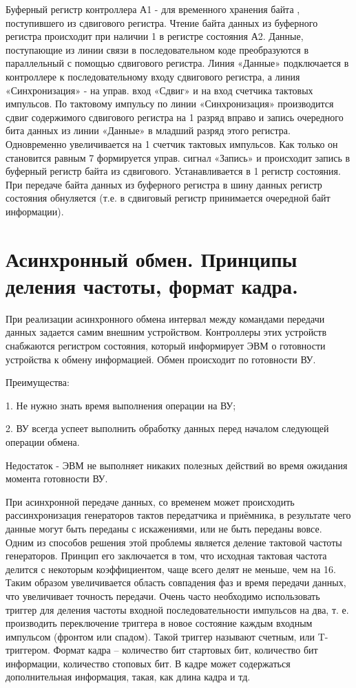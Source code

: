 \documentclass{article}
\begin{document}
Буферный регистр контроллера А1 - для временного хранения байта , поступившего из сдвигового регистра. Чтение байта данных из буферного регистра происходит при наличии 1 в регистре состояния А2.
Данные, поступающие из линии связи в последовательном коде преобразуются в параллельный с помощью сдвигового регистра. Линия «Данные» подключается в контроллере к последовательному входу сдвигового регистра, а линия «Синхронизация» - на управ. вход «Сдвиг» и на вход счетчика тактовых импульсов. По тактовому импульсу по линии «Синхронизация» производится сдвиг содержимого сдвигового регистра на 1 разряд вправо и запись очередного бита данных из линии «Данные» в младший разряд этого регистра. Одновременно увеличивается на 1 счетчик тактовых импульсов. Как только он становится равным 7 формируется управ. сигнал «Запись» и происходит запись в буферный регистр байта из сдвигового. Устанавливается в 1 регистр состояния.
При передаче байта данных из буферного регистра в шину данных регистр состояния обнуляется (т.е. в сдвиговый регистр принимается очередной байт информации).

\section{Асинхронный обмен. Принципы деления частоты, формат кадра.}

При реализации асинхронного обмена интервал между командами передачи данных задается самим внешним устройством. 
Контроллеры этих устройств снабжаются регистром состояния, который информирует ЭВМ о готовности устройства к обмену информацией.
Обмен происходит по готовности ВУ.

Преимущества:

1. Не нужно знать время выполнения операции на ВУ;

2. ВУ всегда успеет выполнить обработку данных перед началом следующей операции обмена.

Недостаток - ЭВМ не выполняет никаких полезных действий во время ожидания момента готовности ВУ.

При асинхронной передаче данных, со временем может происходить рассинхронизация генераторов тактов передатчика и приёмника, в результате чего данные могут быть переданы с искажениями, или не быть переданы вовсе.
Одним из способов решения этой проблемы является деление тактовой частоты генераторов.
Принцип его заключается в том, что исходная тактовая частота делится с некоторым коэффициентом, чаще всего делят не меньше, чем на 16. 
Таким образом увеличивается область совпадения фаз и время передачи данных, что увеличивает точность передачи.
Очень часто необходимо использовать триггер для деления частоты входной последовательности импульсов на два, т. е. производить переключение триггера в новое состояние каждым входным импульсом (фронтом или спадом). 
Такой триггер называют счетным, или T-триггером.
Формат кадра – количество бит стартовых бит, количество бит информации, количество стоповых бит. В кадре может содержаться дополнительная информация, такая, как длина кадра и тд.
\end{document}
